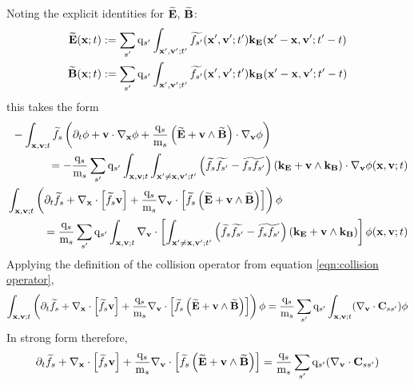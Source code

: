     Noting the explicit identities for $\widetilde{\mathbf{E}}$, $\widetilde{\mathbf{B}}$:
    \begin{align}
        \widetilde{\mathbf{E}}(\mathbf{x}; t)  &:=  \sum_{s'}\mathrm{q}_{s'}\int_{\mathbf{x}', \mathbf{v}'; t'}\widetilde{f_{s'}}(\mathbf{x}', \mathbf{v}'; t')\mathbf{k}_{\mathbf{E}}(\mathbf{x}' - \mathbf{x}, \mathbf{v}'; t' - t)  \\
        \widetilde{\mathbf{B}}(\mathbf{x}; t)  &:=  \sum_{s'}\mathrm{q}_{s'}\int_{\mathbf{x}', \mathbf{v}'; t'}\widetilde{f_{s'}}(\mathbf{x}', \mathbf{v}'; t')\mathbf{k}_{\mathbf{B}}(\mathbf{x}' - \mathbf{x}, \mathbf{v}'; t' - t)
    \end{align}
    this takes the form
    \begin{align}
        \begin{split}
            &- \int_{\mathbf{x}, \mathbf{v}; t}\widetilde{f_{s}}\left(\partial_{t}\phi + \mathbf{v}\cdot\nabla_{\mathbf{x}}\phi + \frac{\mathrm{q}_{s}}{\mathrm{m}_{s}}\left(\widetilde{\mathbf{E}} + \mathbf{v}\wedge\widetilde{\mathbf{B}}\right)\cdot\nabla_{\mathbf{v}}\phi\right)  \\
            &\;\;\;\;\;\;\;\;\;\;\;\;=  - \frac{\mathrm{q}_{s}}{\mathrm{m}_{s}}\sum_{s'}\mathrm{q}_{s'}\int_{\mathbf{x}, \mathbf{v}; t}\int_{\mathbf{x}' \neq \mathbf{x}, \mathbf{v}'; t'}\left(\widetilde{f_{s}}\widetilde{f_{s'}} - \widetilde{f_{s}f_{s'}}\right)(\mathbf{k}_{\mathbf{E}}  + \mathbf{v}\wedge\mathbf{k}_{\mathbf{B}})\cdot\nabla_{\mathbf{v}}\phi(\mathbf{x}, \mathbf{v}; t)
        \end{split}  \\
        \begin{split}
          &\int_{\mathbf{x}, \mathbf{v}; t}\left(\partial_{t}\widetilde{f_{s}} + \nabla_{\mathbf{x}}\cdot\left[\widetilde{f_{s}}\mathbf{v}\right] + \frac{\mathrm{q}_{s}}{\mathrm{m}_{s}}\nabla_{\mathbf{v}}\cdot\left[\widetilde{f_{s}}\left(\widetilde{\mathbf{E}} + \mathbf{v}\wedge\widetilde{\mathbf{B}}\right)\right]\right)\phi  \\
          &\;\;\;\;\;\;\;\;\;\;\;\;=  \frac{\mathrm{q}_{s}}{\mathrm{m}_{s}}\sum_{s'}\mathrm{q}_{s'}\int_{\mathbf{x}, \mathbf{v}; t}\nabla_{\mathbf{v}}\cdot\left[\int_{\mathbf{x}' \neq \mathbf{x}, \mathbf{v}'; t'}\left(\widetilde{f_{s}}\widetilde{f_{s'}} - \widetilde{f_{s}f_{s'}}\right)(\mathbf{k}_{\mathbf{E}}  + \mathbf{v}\wedge\mathbf{k}_{\mathbf{B}})\right]\phi(\mathbf{x}, \mathbf{v}; t)
        \end{split}
    \end{align}
    Applying the definition of the collision operator from equation \ref{eqn:collision operator},
    \begin{equation}
        \int_{\mathbf{x}, \mathbf{v}; t}\left(\partial_{t}\widetilde{f_{s}} + \nabla_{\mathbf{x}}\cdot\left[\widetilde{f_{s}}\mathbf{v}\right] + \frac{\mathrm{q}_{s}}{\mathrm{m}_{s}}\nabla_{\mathbf{v}}\cdot\left[\widetilde{f_{s}}\left(\widetilde{\mathbf{E}} + \mathbf{v}\wedge\widetilde{\mathbf{B}}\right)\right]\right)\phi  =  \frac{\mathrm{q}_{s}}{\mathrm{m}_{s}}\sum_{s'}\mathrm{q}_{s'}\int_{\mathbf{x}, \mathbf{v}; t}(\nabla_{\mathbf{v}}\cdot\mathbf{C}_{ss'})\phi
    \end{equation}
    In strong form therefore,
    \begin{equation}
        \partial_{t}\widetilde{f_{s}} + \nabla_{\mathbf{x}}\cdot\left[\widetilde{f_{s}}\mathbf{v}\right] + \frac{\mathrm{q}_{s}}{\mathrm{m}_{s}}\nabla_{\mathbf{v}}\cdot\left[\widetilde{f_{s}}\left(\widetilde{\mathbf{E}} + \mathbf{v}\wedge\widetilde{\mathbf{B}}\right)\right]  =  \frac{\mathrm{q}_{s}}{\mathrm{m}_{s}}\sum_{s'}\mathrm{q}_{s'}(\nabla_{\mathbf{v}}\cdot\mathbf{C}_{ss'})
    \end{equation}

    